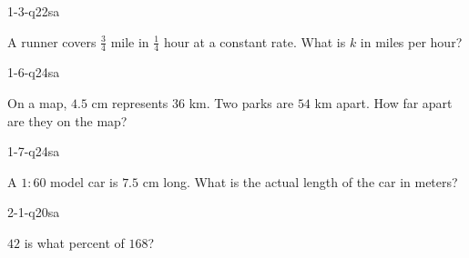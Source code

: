 \documentclass[12pt, fleqn, openany]{studyGuide}
\begin{document}
\renewcommand{\VMBookTitle}{3 Oklahoma OSTP Grade 7 Math Practice Tests}
\renewcommand{\VMBookSubtitle}{Full-Length Test Prep with Detailed Answer Explanations}
\renewcommand{\VMFooterURL}{https://viewmath.com/grade7}
\renewcommand{\VMFooterURLDisplay}{ViewMath.com/Grade7}






\tableofcontents
\cleardoublepage
{}


\begin{practiceQuestion}{1-3-q22}{sa}
\begin{questionText}
A runner covers $\frac{3}{4}$ mile in $\frac{1}{4}$ hour at a constant rate. What is $k$ in miles per hour?
\end{questionText}
\end{practiceQuestion}

\begin{practiceQuestion}{1-6-q24}{sa}
\begin{questionText}
On a map, $4.5$ cm represents $36$ km. Two parks are $54$ km apart. How far apart are they on the map?
\end{questionText}
\end{practiceQuestion}

\begin{practiceQuestion}{1-7-q24}{sa}
\begin{questionText}
A $1 : 60$ model car is $7.5$ cm long. What is the actual length of the car in meters?
\end{questionText}
\end{practiceQuestion}

\begin{practiceQuestion}{2-1-q20}{sa}
\begin{questionText}
$42$ is what percent of $168$?
\end{questionText}
\end{practiceQuestion}
\end{document}
